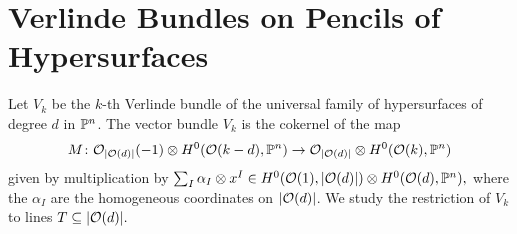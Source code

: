 \section{Verlinde Bundles on Pencils of Hypersurfaces}

\newcommand{\schemeofsurfaces}[1][d]{\abs{\mc{O}(#1)}}
\newcommand{\divides}{\mid}

Let $V_k$ be the $k$-th Verlinde bundle of the universal family of hypersurfaces of degree $d$ in $\mathbb{P}^n$. The vector bundle $V_k$ is the cokernel of the map
\[
M \from \mc{O}_{\schemeofsurfaces}(-1) \otimes H^0(\mc{O}(k-d),\PP^n)
	\to \mc{O}_{\schemeofsurfaces} \otimes H^0(\mc{O}(k),\PP^n)
\]
given by multiplication by
$\sum_I \alpha_I \otimes x^I
\in H^0(\mc{O}(1),\schemeofsurfaces) \otimes H^0(\mc{O}(d),\PP^n),$ where the $\alpha_I$ are the homogeneous coordinates on $\schemeofsurfaces$.
We study the restriction of $V_k$ to lines $T\subseteq \schemeofsurfaces.$






